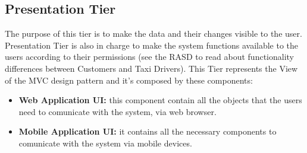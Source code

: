 \documentclass[../../../../../../dd.tex]{subfiles}
\begin{document}
	\subsection{Presentation Tier}
		The purpose of this tier is to make the data and their changes visible to the user. Presentation Tier is also in charge to make the system functions available to the users according to their permissions (see the RASD to read about functionality differences between Customers and Taxi Drivers).
		This Tier represents the View of the MVC design pattern and it's composed by these components:
		\begin{itemize}
			\item \textbf{Web Application UI:}  this component contain all the objects that the users need to comunicate with the system, via web browser.
			\item \textbf{Mobile Application UI:} it contains all the necessary components to comunicate with the system via mobile devices. 
		\end{itemize}
	
\end{document}
